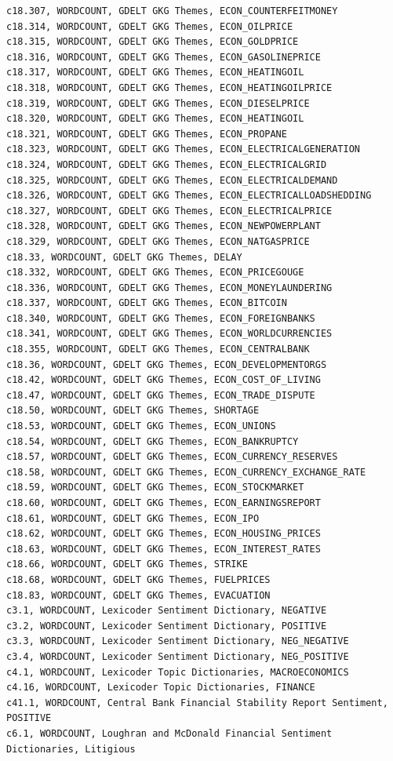 \documentclass[12pt]{article}
\begin{document}
\begin{verbatim}
c18.307, WORDCOUNT, GDELT GKG Themes, ECON_COUNTERFEITMONEY
c18.314, WORDCOUNT, GDELT GKG Themes, ECON_OILPRICE
c18.315, WORDCOUNT, GDELT GKG Themes, ECON_GOLDPRICE
c18.316, WORDCOUNT, GDELT GKG Themes, ECON_GASOLINEPRICE
c18.317, WORDCOUNT, GDELT GKG Themes, ECON_HEATINGOIL
c18.318, WORDCOUNT, GDELT GKG Themes, ECON_HEATINGOILPRICE
c18.319, WORDCOUNT, GDELT GKG Themes, ECON_DIESELPRICE
c18.320, WORDCOUNT, GDELT GKG Themes, ECON_HEATINGOIL
c18.321, WORDCOUNT, GDELT GKG Themes, ECON_PROPANE
c18.323, WORDCOUNT, GDELT GKG Themes, ECON_ELECTRICALGENERATION
c18.324, WORDCOUNT, GDELT GKG Themes, ECON_ELECTRICALGRID
c18.325, WORDCOUNT, GDELT GKG Themes, ECON_ELECTRICALDEMAND
c18.326, WORDCOUNT, GDELT GKG Themes, ECON_ELECTRICALLOADSHEDDING
c18.327, WORDCOUNT, GDELT GKG Themes, ECON_ELECTRICALPRICE
c18.328, WORDCOUNT, GDELT GKG Themes, ECON_NEWPOWERPLANT
c18.329, WORDCOUNT, GDELT GKG Themes, ECON_NATGASPRICE
c18.33, WORDCOUNT, GDELT GKG Themes, DELAY
c18.332, WORDCOUNT, GDELT GKG Themes, ECON_PRICEGOUGE
c18.336, WORDCOUNT, GDELT GKG Themes, ECON_MONEYLAUNDERING
c18.337, WORDCOUNT, GDELT GKG Themes, ECON_BITCOIN
c18.340, WORDCOUNT, GDELT GKG Themes, ECON_FOREIGNBANKS
c18.341, WORDCOUNT, GDELT GKG Themes, ECON_WORLDCURRENCIES
c18.355, WORDCOUNT, GDELT GKG Themes, ECON_CENTRALBANK
c18.36, WORDCOUNT, GDELT GKG Themes, ECON_DEVELOPMENTORGS
c18.42, WORDCOUNT, GDELT GKG Themes, ECON_COST_OF_LIVING
c18.47, WORDCOUNT, GDELT GKG Themes, ECON_TRADE_DISPUTE
c18.50, WORDCOUNT, GDELT GKG Themes, SHORTAGE
c18.53, WORDCOUNT, GDELT GKG Themes, ECON_UNIONS
c18.54, WORDCOUNT, GDELT GKG Themes, ECON_BANKRUPTCY
c18.57, WORDCOUNT, GDELT GKG Themes, ECON_CURRENCY_RESERVES
c18.58, WORDCOUNT, GDELT GKG Themes, ECON_CURRENCY_EXCHANGE_RATE
c18.59, WORDCOUNT, GDELT GKG Themes, ECON_STOCKMARKET
c18.60, WORDCOUNT, GDELT GKG Themes, ECON_EARNINGSREPORT
c18.61, WORDCOUNT, GDELT GKG Themes, ECON_IPO
c18.62, WORDCOUNT, GDELT GKG Themes, ECON_HOUSING_PRICES
c18.63, WORDCOUNT, GDELT GKG Themes, ECON_INTEREST_RATES
c18.66, WORDCOUNT, GDELT GKG Themes, STRIKE
c18.68, WORDCOUNT, GDELT GKG Themes, FUELPRICES
c18.83, WORDCOUNT, GDELT GKG Themes, EVACUATION
c3.1, WORDCOUNT, Lexicoder Sentiment Dictionary, NEGATIVE
c3.2, WORDCOUNT, Lexicoder Sentiment Dictionary, POSITIVE
c3.3, WORDCOUNT, Lexicoder Sentiment Dictionary, NEG_NEGATIVE
c3.4, WORDCOUNT, Lexicoder Sentiment Dictionary, NEG_POSITIVE
c4.1, WORDCOUNT, Lexicoder Topic Dictionaries, MACROECONOMICS
c4.16, WORDCOUNT, Lexicoder Topic Dictionaries, FINANCE
c41.1, WORDCOUNT, Central Bank Financial Stability Report Sentiment, POSITIVE
c6.1, WORDCOUNT, Loughran and McDonald Financial Sentiment Dictionaries, Litigious

\end{verbatim}
\end{document}
